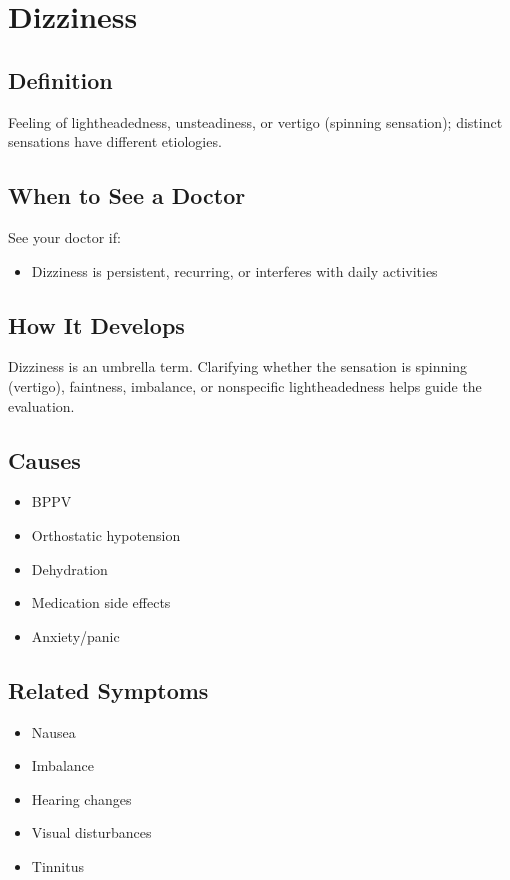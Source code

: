 \chapter{Dizziness}

\section*{Definition}
Feeling of lightheadedness, unsteadiness, or vertigo (spinning sensation); distinct sensations have different etiologies.

\section*{When to See a Doctor}
See your doctor if:
\begin{itemize}
  \item Dizziness is persistent, recurring, or interferes with daily activities
\end{itemize}

\section*{How It Develops}
Dizziness is an umbrella term. Clarifying whether the sensation is spinning (vertigo), faintness, imbalance, or nonspecific lightheadedness helps guide the evaluation.

\section*{Causes}
\begin{itemize}
  \item BPPV
  \item Orthostatic hypotension
  \item Dehydration
  \item Medication side effects
  \item Anxiety/panic
\end{itemize}

\section*{Related Symptoms}
\begin{itemize}
  \item Nausea
  \item Imbalance
  \item Hearing changes
  \item Visual disturbances
  \item Tinnitus
\end{itemize}

